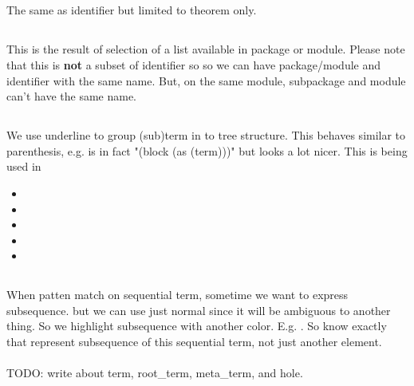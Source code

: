\subsection{} The same as identifier but limited to theorem only.

\subsection{} This is the result of selection of a list available in package or module. Please note that this is \textbf{not} a subset of identifier so so we can have package/module and identifier with the same name. But, on the same module, subpackage and module can't have the same name.

\subsection{} We use underline to group (sub)term in to tree structure. This behaves similar to parenthesis, e.g.  is in fact "(block (as (term)))" but looks a lot nicer. This is being used in
\begin{itemize}
    \item {}
    \item {}
    \item {}
    \item {}
    \item {}
\end{itemize}

\subsection{}
When patten match on sequential term, sometime we want to express subsequence. but we can use just normal  since it will be ambiguous to another thing. So we highlight subsequence with another color. E.g. . \psfmt{,} So know exactly that  represent subsequence of this sequential term, not just another element. \\ \\

TODO: write about term, root\_term, meta\_term, and hole.

